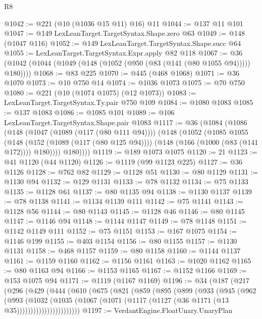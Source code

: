 \begin{lexlean}{R8}
\begin{coremodule}
@1042 := @221 (@10 (@1036 @15 @11) @16) @11
@1044 := @137 @11 @101
@1047 := @149 LexLeanTarget.TargetSyntax.Shape.zero @63
@1049 := @148 (@1047 @116)
@1052 := @149 LexLeanTarget.TargetSyntax.Shape.succ @64
@1055 := LexLeanTarget.TargetSyntax.Expr.apply @82 @118
@1067 := @36 (@1042 (@1044 (@1049 (@148 (@1052 (@950 (@83 (@141 (@80 @1055 @94))))) @180))))
@1068 := @83 @225
@1070 := @445 (@468 @1068)
@1071 := @36 @1070
@1073 := @10 @750 @14
@1074 := @1036 @1073
@1075 := @70 @750
@1080 := @221 (@10 (@1074 @1075) (@12 @1073))
@1083 := LexLeanTarget.TargetSyntax.Ty.pair @750 @109
@1084 := @1080 @1083
@1085 := @137 @1083
@1086 := @1085 @101
@1089 := @106 LexLeanTarget.TargetSyntax.Shape.pair @1083
@1117 := @36
    (@1084
      (@1086
        (@148
          (@1047 (@1089 (@117 (@80 @111 @94))))
          (@148
            (@1052
              (@1085
                @1055
                (@148
                  (@152 (@1089 (@117 (@80 @125 @94))))
                  (@148 (@166 (@1000 (@83 (@141 @172)))) @180))))
            @180))))
@1119 := @189 @1073 @1075
@1120 := 21
@1123 := @41 @1120 (@44 @1120)
@1126 := @1119 (@99 @1123 @225)
@1127 := @36 @1126
@1128 := @762 @82
@1129 := @1128 @51
@1130 := @80 @1129
@1131 := @1130 @94
@1132 := @129 @1131
@1133 := @78 @1132
@1134 := @75 @1133
@1135 := @1128 @61
@1137 := @80 @1135 @94
@1138 := @1130 @1137
@1139 := @78 @1138
@1141 := @1134 @1139 @111
@1142 := @75 @1141
@1143 := @1128 @56
@1144 := @80 @1143
@1145 := @1128 @46
@1146 := @80 @1145
@1147 := @1146 @94
@1148 := @1144 @1147
@1149 := @78 @1148
@1151 := @1142 @1149 @111
@1152 := @75 @1151
@1153 := @167 @1075
@1154 := @1146 @199
@1155 := @403 @1154
@1156 := @80 @1155
@1157 := @1130 @1131
@1158 := @468 @1157
@1159 := @80 @1158
@1160 := @1144 @1137
@1161 := @1159 @1160
@1162 := @1156 @1161
@1163 := @1020 @1162
@1165 := @80 @1163 @94
@1166 := @1153 @1165
@1167 := @1152 @1166
@1169 := @153 @1075 @94
@1171 := @1119 (@1167 @1169)
@1196 := @34
    (@187
      (@217
        (@296
          (@429
            (@444
              (@610
                (@675
                  (@821
                    (@859
                      (@895
                        (@899
                          (@933
                            (@945
                              (@962
                                (@993
                                  (@1032
                                    (@1035
                                      (@1067
                                        (@1071
                                          (@1117 (@1127 (@36 @1171 (@13 @35)))))))))))))))))))))))
@1197 := VerdantEngine.FloatUnary.UnaryPlan

\end{coremodule}
\end{lexlean}
